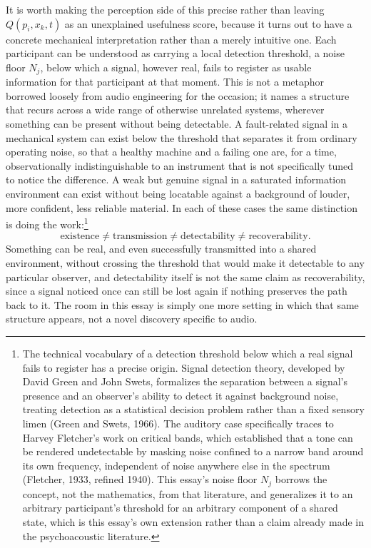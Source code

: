 \documentclass[12pt]{article}
\begin{document}
It is worth making the perception side of this precise rather than leaving $Q(p_i, x_k, t)$ as an unexplained usefulness score, because it turns out to have a concrete mechanical interpretation rather than a merely intuitive one. Each participant can be understood as carrying a local detection threshold, a noise floor $N_j$, below which a signal, however real, fails to register as usable information for that participant at that moment. This is not a metaphor borrowed loosely from audio engineering for the occasion; it names a structure that recurs across a wide range of otherwise unrelated systems, wherever something can be present without being detectable. A fault-related signal in a mechanical system can exist below the threshold that separates it from ordinary operating noise, so that a healthy machine and a failing one are, for a time, observationally indistinguishable to an instrument that is not specifically tuned to notice the difference. A weak but genuine signal in a saturated information environment can exist without being locatable against a background of louder, more confident, less reliable material. In each of these cases the same distinction is doing the work:\footnote{The technical vocabulary of a detection threshold below which a real signal fails to register has a precise origin. Signal detection theory, developed by David Green and John Swets, formalizes the separation between a signal's presence and an observer's ability to detect it against background noise, treating detection as a statistical decision problem rather than a fixed sensory limen (Green and Swets, 1966). The auditory case specifically traces to Harvey Fletcher's work on critical bands, which established that a tone can be rendered undetectable by masking noise confined to a narrow band around its own frequency, independent of noise anywhere else in the spectrum (Fletcher, 1933, refined 1940). This essay's noise floor $N_j$ borrows the concept, not the mathematics, from that literature, and generalizes it to an arbitrary participant's threshold for an arbitrary component of a shared state, which is this essay's own extension rather than a claim already made in the psychoacoustic literature.}
\[
\text{existence} \neq \text{transmission} \neq \text{detectability} \neq \text{recoverability}.
\]
Something can be real, and even successfully transmitted into a shared environment, without crossing the threshold that would make it detectable to any particular observer, and detectability itself is not the same claim as recoverability, since a signal noticed once can still be lost again if nothing preserves the path back to it. The room in this essay is simply one more setting in which that same structure appears, not a novel discovery specific to audio.
\end{document}
